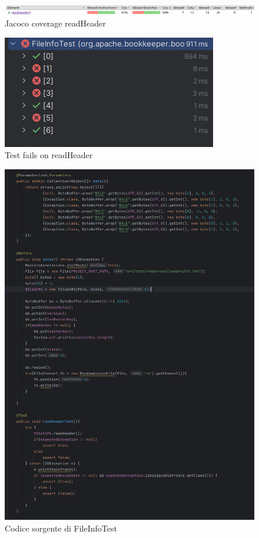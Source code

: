 \documentclass[12pt, a4paper]{article}
\begin{document}
  \begin{figure}
    \includegraphics[width=\linewidth]{./images/file_info/JacocoCoveragereadHeader1.png}
    \caption{Jacoco coverage readHeader}
    \label{fig:JacocoCoveragereadHeader1}
  \end{figure}

  \begin{figure}
    \includegraphics[width=\linewidth]{./images/file_info/TestCasesFails.png}
    \caption{Test fails on readHeader}
    \label{fig:TestFailsReadHeader}
  \end{figure}

  \begin{figure}
    \includegraphics[width=\linewidth]{./images/file_info/Code1ReadHeader.png}
    \caption{Codice sorgente di FileInfoTest}
    \label{fig:Code1ReadHeader}
  \end{figure}
\end{document}
